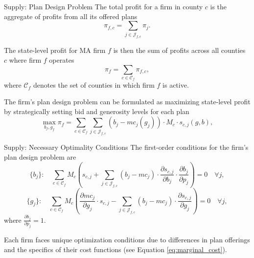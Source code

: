 \documentclass[professionalfonts, aspectratio=169]{beamer}
\begin{document}
\begin{frame}{Supply: Plan Design Problem}
  The total profit for a firm in county $c$ is the aggregate of profits from all its offered plans
  \begin{equation}
      \pi_{f,c} = \sum_{j \in \mathcal{J}_{f,c}} \pi_{j}.
  \end{equation}

  The state-level profit for MA firm $f$ is then the sum of profits across all counties $c$ where firm $f$ operates
  \begin{equation}
      \pi_{f} = \sum_{c \in \mathcal{C}_f} \pi_{f,c},
  \end{equation}
  where $\mathcal{C}_f$ denotes the set of counties in which firm $f$ is active.

  The firm's plan design problem can be formulated as maximizing state-level profit by strategically setting bid and generosity levels for each plan
  \begin{equation}
  \label{eq:objective_function}
      \max_{b_f, g_f} \pi_{f} = \sum_{c \in \mathcal{C}_f } \sum_{j \in \mathcal{J}_{f,c} } (b_j - mc_j(g_j)) \cdot M_c \cdot s_{c,j}(g, b),
  \end{equation}

\end{frame}

\begin{frame}{Supply: Necessary Optimality Conditions}
  The first-order conditions for the firm's plan design problem are
  \begin{equation}
    \label{eq:bid_foc}
        \{b_j\}: \quad \sum_{c \in \mathcal{C}_f} 
        M_c \left(s_{c,j} + \sum_{j \in \mathcal{J}_{f,c}} (b_j - mc_j) \cdot \frac{\partial s_{c,j}}{\partial b_j} \cdot
        \frac{\partial b_j}{\partial p_j} \right) = 0 
        \quad \forall j,
    \end{equation}
    \begin{equation}
    \label{eq:generosity_foc}
        \{g_j\}: \quad \sum_{c \in \mathcal{C}_f} 
        M_c \left( 
            \frac{\partial mc_j}{\partial g_j} \cdot s_{c,j} - 
            \sum_{j \in \mathcal{J}_{f,c}}
            (b_j - mc_j) \cdot \frac{\partial s_{c,j}}{\partial g_j}
        \right) = 0
        \quad \forall j,
    \end{equation}
    where $\frac{\partial b_j}{\partial p_j} = 1$.

    Each firm faces unique optimization conditions due to differences in plan offerings and the specifics of their cost functions (see Equation \ref{eq:marginal_cost}).

\end{frame}
\end{document}

